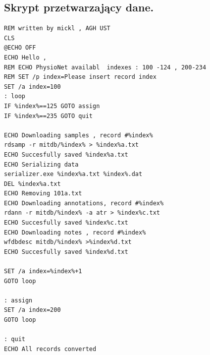 \subsection{Skrypt przetwarzający dane.}
\label{sec:skrypt}

\begin{minipage}{\textwidth}
\begin{verbatim}
REM written by mickl , AGH UST
CLS
@ECHO OFF
ECHO Hello ,
REM ECHO PhysioNet availabl  indexes : 100 -124 , 200-234
REM SET /p index=Please insert record index
SET /a index=100
: loop
IF %index%==125 GOTO assign
IF %index%==235 GOTO quit

ECHO Downloading samples , record #%index%
rdsamp -r mitdb/%index% > %index%a.txt
ECHO Succesfully saved %index%a.txt
ECHO Serializing data
serializer.exe %index%a.txt %index%.dat
DEL %index%a.txt
ECHO Removing 101a.txt
ECHO Downloading annotations, record #%index%
rdann -r mitdb/%index% -a atr > %index%c.txt
ECHO Succesfully saved %index%c.txt
ECHO Downloading notes , record #%index%
wfdbdesc mitdb/%index% >%index%d.txt
ECHO Succesfully saved %index%d.txt

SET /a index=%index%+1
GOTO loop

: assign
SET /a index=200
GOTO loop

: quit
ECHO All records converted
\end{verbatim}
\end{minipage}